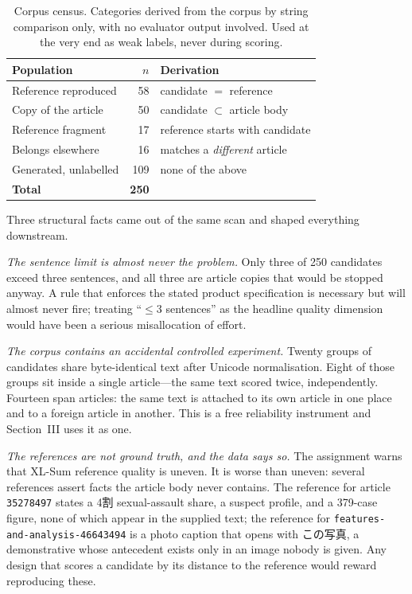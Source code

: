 \documentclass[conference]{IEEEtran}
\begin{document}
\begin{table}[t]
\caption{Corpus census. Categories derived from the corpus by string
comparison only, with no evaluator output involved. Used at the very end
as weak labels, never during scoring.}
\label{tab:census}
\centering\footnotesize
\begin{tabularx}{\columnwidth}{@{}p{27mm}rY@{}}
\toprule
\textbf{Population} & \textbf{$n$} & \textbf{Derivation} \\
\midrule
Reference reproduced   & 58  & candidate $=$ reference \\
Copy of the article    & 50  & candidate $\subset$ article body \\
Reference fragment     & 17  & reference starts with candidate \\
Belongs elsewhere      & 16  & matches a \emph{different} article \\
Generated, unlabelled  & 109 & none of the above \\
\midrule
\textbf{Total}         & \textbf{250} & \\
\bottomrule
\end{tabularx}
\end{table}

Three structural facts came out of the same scan and shaped everything
downstream.

\emph{The sentence limit is almost never the problem.} Only three of 250
candidates exceed three sentences, and all three are article copies that
would be stopped anyway. A rule that enforces the stated product
specification is necessary but will almost never fire; treating
``$\leq 3$ sentences'' as the headline quality dimension would have been
a serious misallocation of effort.

\emph{The corpus contains an accidental controlled experiment.} Twenty
groups of candidates share byte-identical text after Unicode
normalisation. Eight of those groups sit inside a single article---the
same text scored twice, independently. Fourteen span articles: the same
text is attached to its own article in one place and to a foreign
article in another. This is a free reliability instrument and Section~III
uses it as one.

\emph{The references are not ground truth, and the data says so.} The
assignment warns that XL-Sum reference quality is uneven. It is worse
than uneven: several references assert facts the article body never
contains. The reference for article \texttt{35278497} states a 4割
sexual-assault share, a suspect profile, and a 379-case figure, none of
which appear in the supplied text; the reference for
\texttt{features-and-analysis-46643494} is a photo caption that opens
with \mbox{この写真}, a demonstrative whose antecedent exists only in an image
nobody is given. Any design that scores a candidate by its distance to
the reference would reward reproducing these.
\end{document}
